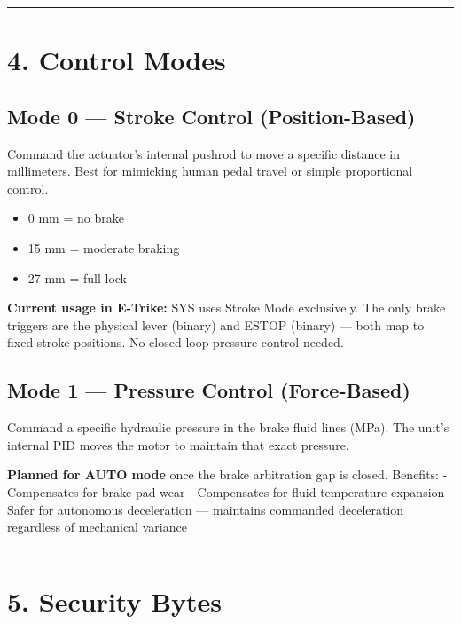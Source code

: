 \documentclass[12pt,a4paper,oneside]{report}
\providecommand{\tightlist}{\setlength{\itemsep}{0pt}\setlength{\parskip}{0pt}}
\begin{document}
\begin{center}\rule{0.5\linewidth}{0.5pt}\end{center}

\section{4. Control Modes}\label{control-modes}

\subsection{Mode 0 --- Stroke Control
(Position-Based)}\label{mode-0-stroke-control-position-based}

Command the actuator's internal pushrod to move a specific distance in
millimeters. Best for mimicking human pedal travel or simple proportional
control.

\begin{itemize}
\tightlist
\item
  0 mm = no brake
\item
  15 mm = moderate braking
\item
  27 mm = full lock
\end{itemize}

\textbf{Current usage in E-Trike:} SYS uses Stroke Mode exclusively. The only
brake triggers are the physical lever (binary) and ESTOP (binary) --- both map
to fixed stroke positions. No closed-loop pressure control needed.

\subsection{Mode 1 --- Pressure Control
(Force-Based)}\label{mode-1-pressure-control-force-based}

Command a specific hydraulic pressure in the brake fluid lines (MPa). The unit's
internal PID moves the motor to maintain that exact pressure.

\textbf{Planned for AUTO mode} once the brake arbitration gap is closed.
Benefits: - Compensates for brake pad wear - Compensates for fluid temperature
expansion - Safer for autonomous deceleration --- maintains commanded
deceleration regardless of mechanical variance

\begin{center}\rule{0.5\linewidth}{0.5pt}\end{center}

\section{5. Security Bytes}\label{security-bytes}
\end{document}

